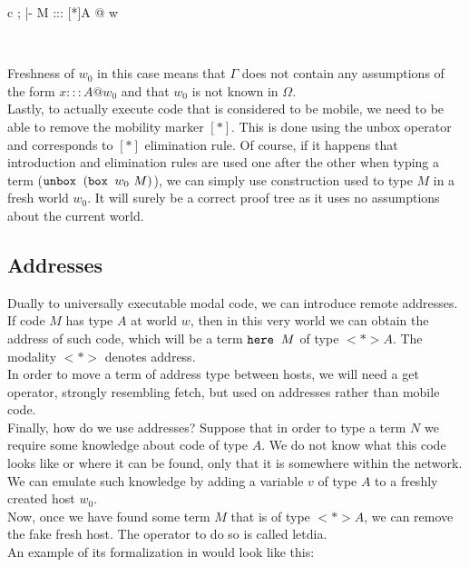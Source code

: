 \begin{center}
\footnotesize
\begin{tabular}{ c }
			     {\Omega; \Gamma |- \bbox {} M ::: [*]A @ w}
\end{tabular}\\[0.1cm]
\normalsize
\end{center}

Freshness of $w_0$ in this case means that $\Gamma$ does not contain any assumptions of the form $x ::: A @ {w_0}$ and that $w_0$ is not known in $\Omega$.\\

Lastly, to actually execute code that is considered to be mobile, we need to be able to remove the mobility marker $[*]$. This is done using the unbox operator and corresponds to $[*]$ elimination rule. Of course, if it happens that introduction and elimination rules are used one after the other when typing a term ($\mbox{$\operatorname{\texttt{unbox}}_{}\ {(}$}\mbox{$\operatorname{\texttt{box}}_{}\ {w_0}\ {M}$})$), we can simply use construction used to type $M$ in a fresh world $w_0$. It will surely be a correct proof  tree as it uses no assumptions about the current world.

\subsection{Addresses}
Dually to universally executable modal code, we can introduce remote addresses. If code $M$ has type $A$ at world $w$, then in this very world we can obtain the address of such code, which will be a term $\mbox{$\operatorname{\texttt{here}}_{}\ {M}$}$ of type $<*>A$. The modality $<*>$ denotes address.\\

In order to move a term of address type between hosts, we will need a get operator, strongly resembling fetch, but used  on addresses rather than mobile code.\\

Finally, how do we use addresses? Suppose that in order to type a term $N$ we require some knowledge about code of type $A$. We do not know what this code looks like or where it can be found, only that it is somewhere within the network. We can emulate such knowledge by adding a variable $v$ of type $A$ to a freshly created host $w_0$.\\

Now, once we have found some term $M$ that is of type $<*>A$, we can remove the fake fresh host.
The operator to do so is called letdia.\\
An example of its formalization in \langL{} would look like this:

